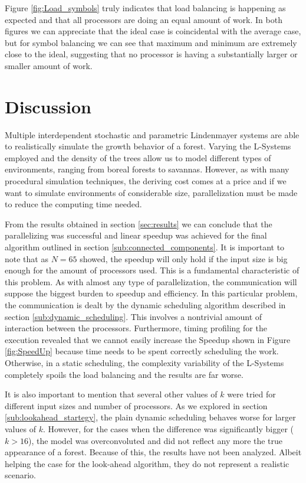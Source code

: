 \documentclass[letterpaper,twoside,11pt]{article}
\begin{document}
\begin{multicols}{2}
Figure \ref{fig:Load_symbols} truly indicates that load balancing is happening as expected and that all processors are doing an equal amount of work. In both figures we can appreciate that the ideal case is coincidental with the average case, but for symbol balancing we can see that maximum and minimum are extremely close to the ideal, suggesting that no processor is having a substantially larger or smaller amount of work.



\section{Discussion} %
\label{sec:discussion}

Multiple interdependent stochastic and parametric Lindenmayer systems are able to realistically simulate the growth behavior of a forest. Varying the L-Systems employed and the density of the trees allow us to model different types of environments, ranging from boreal forests to savannas. However, as with many procedural simulation techniques, the deriving cost comes at a price and if we want to simulate environments of considerable size, parallelization must be made to reduce the computing time needed.

From the results obtained in section \ref{sec:results} we can conclude that the parallelizing was successful and linear speedup was achieved for the final algorithm outlined in section \ref{sub:connected_components}. It is important to note that as $N = 65$ showed, the speedup will only hold if the input size is big enough for the amount of processors used. This is a fundamental characteristic of this problem. As with almost any type of parallelization, the communication will suppose the biggest burden to speedup and efficiency. In this particular problem, the communication is dealt by the dynamic scheduling algorithm described in section \ref{sub:dynamic_scheduling}. This involves a nontrivial amount of interaction between the processors. Furthermore, timing profiling for the execution revealed that we cannot easily increase the Speedup shown in Figure \ref{fig:SpeedUp} because time needs to be spent correctly scheduling the work. Otherwise, in a static scheduling, the complexity variability of the L-Systems completely spoils the load balancing and the results are far worse.

It is also important to mention that several other values of $k$ were tried for different input sizes and number of processors. As we explored in section \ref{sub:lookahead_startegy}, the plain dynamic scheduling behaves worse for larger values of $k$. However, for the cases when the difference was significantly bigger ($k > 16$), the model was overconvoluted and did not reflect any more the true appearance of a forest. Because of this, the results have not been analyzed. Albeit helping the case for the look-ahead algorithm, they do not represent a realistic scenario.


\end{multicols}
\end{document}
